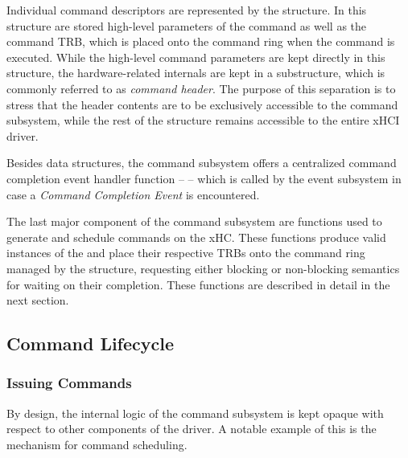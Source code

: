 Individual command descriptors are represented by the 
structure. In this structure are stored high-level parameters of the command as well as
the command TRB, which is placed onto the command ring when the command is
executed. While the high-level command parameters are kept directly in this
structure, the hardware-related internals are kept in a substructure, which is
commonly referred to as \textit{command header}. The purpose of this separation
is to stress that the header contents are to be exclusively accessible to the
command subsystem, while the rest of the structure remains accessible to
the entire xHCI driver.

Besides data structures, the command subsystem offers a centralized command
completion event handler function --  --
which is called by the event subsystem in case a \textit{Command Completion
Event} is encountered.

The last major component of the command subsystem are functions used to generate
and schedule commands on the xHC. These functions produce valid instances of the
 and place their respective TRBs onto the command ring
managed by the  structure, requesting either blocking or
non-blocking semantics for waiting on their completion. These functions are
described in detail in the next section.


\subsection{Command Lifecycle}

\subsubsection{Issuing Commands}

By design, the internal logic of the command subsystem is kept opaque with
respect to other components of the driver. A notable example of this is the
mechanism for command scheduling.

